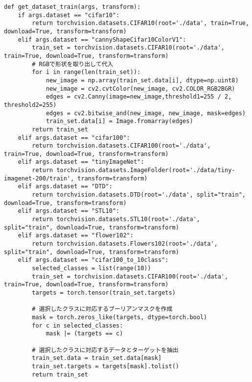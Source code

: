 {\begin{verbatim}
def get_dataset_train(args, transform):
    if args.dataset == "cifar10":
        return torchvision.datasets.CIFAR10(root='./data', train=True, download=True, transform=transform)
    elif args.dataset == "cannyShapeCifar10ColorV1":
        train_set = torchvision.datasets.CIFAR10(root='./data', train=True, download=True, transform=transform)
        # RGBで形状を取り出して代入
        for i in range(len(train_set)):
            new_image = np.array(train_set.data[i], dtype=np.uint8)
            new_image = cv2.cvtColor(new_image, cv2.COLOR_RGB2BGR)
            edges = cv2.Canny(image=new_image,threshold1=255 / 2, threshold2=255)
            edges = cv2.bitwise_and(new_image, new_image, mask=edges)
            train_set.data[i] = Image.fromarray(edges)
        return train_set
    elif args.dataset == "cifar100":
        return torchvision.datasets.CIFAR100(root='./data', train=True, download=True, transform=transform)
    elif args.dataset == "tinyImageNet":
        return torchvision.datasets.ImageFolder(root='./data/tiny-imagenet-200/train', transform=transform)
    elif args.dataset == "DTD":
        return torchvision.datasets.DTD(root='./data', split="train", download=True, transform=transform)
    elif args.dataset == "STL10":
        return torchvision.datasets.STL10(root='./data', split="train", download=True, transform=transform)
    elif args.dataset == "flower102":
        return torchvision.datasets.Flowers102(root='./data', split="train", download=True, transform=transform)
    elif args.dataset == "cifar100_to_10class":
        selected_classes = list(range(10))
        train_set = torchvision.datasets.CIFAR100(root='./data', train=True, download=True, transform=transform)
        targets = torch.tensor(train_set.targets)
    
        # 選択したクラスに対応するブーリアンマスクを作成
        mask = torch.zeros_like(targets, dtype=torch.bool)
        for c in selected_classes:
            mask |= (targets == c)
        
        # 選択したクラスに対応するデータとターゲットを抽出
        train_set.data = train_set.data[mask]
        train_set.targets = targets[mask].tolist()
        return train_set
        

\end{verbatim}}
